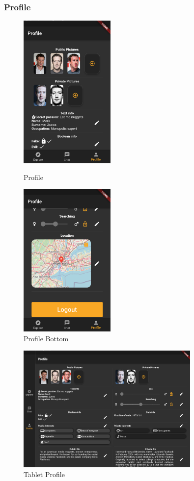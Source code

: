 \documentclass{article}
\begin{document}
\clearpage
\subsubsection{Profile}
\begin{figure}[!htb]
	\centering
	\begin{minipage}{.45\textwidth}
		\centering
		\includegraphics[height=7.7cm,keepaspectratio]{assets/images/ui/profile/18-profile-screen.png}
		\caption{Profile}
	\end{minipage}\quad
	\begin{minipage}{.45\textwidth}
		\centering
		\includegraphics[height=7.7cm,keepaspectratio]{assets/images/ui/profile/19-profile-screen-2.png}
		\caption{Profile Bottom}
	\end{minipage}
\end{figure}
\begin{figure}[!htb]
	\centering
	\includegraphics[width=0.8\textwidth]{assets/images/ui/profile/tabler-profile-screen.png}
	\caption{Tablet Profile}
\end{figure}
\end{document}
